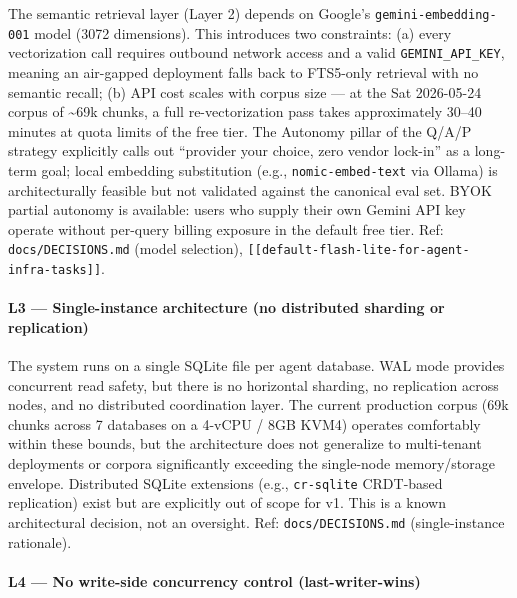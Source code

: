 \documentclass[
]{article}
\begin{document}
The semantic retrieval layer (Layer 2) depends on Google's
\texttt{gemini-embedding-001} model (3072 dimensions). This introduces
two constraints: (a) every vectorization call requires outbound network
access and a valid \texttt{GEMINI\_API\_KEY}, meaning an air-gapped
deployment falls back to FTS5-only retrieval with no semantic recall;
(b) API cost scales with corpus size --- at the Sat 2026-05-24 corpus of
\textasciitilde69k chunks, a full re-vectorization pass takes
approximately 30--40 minutes at quota limits of the free tier. The
Autonomy pillar of the Q/A/P strategy explicitly calls out ``provider
your choice, zero vendor lock-in'' as a long-term goal; local embedding
substitution (e.g., \texttt{nomic-embed-text} via Ollama) is
architecturally feasible but not validated against the canonical eval
set. BYOK partial autonomy is available: users who supply their own
Gemini API key operate without per-query billing exposure in the default
free tier. Ref: \texttt{docs/DECISIONS.md} (model selection),
\texttt{{[}{[}default-flash-lite-for-agent-infra-tasks{]}{]}}.

\paragraph{L3 --- Single-instance architecture (no distributed sharding
or
replication)}\label{l3-single-instance-architecture-no-distributed-sharding-or-replication}

The system runs on a single SQLite file per agent database. WAL mode
provides concurrent read safety, but there is no horizontal sharding, no
replication across nodes, and no distributed coordination layer. The
current production corpus (69k chunks across 7 databases on a 4-vCPU /
8GB KVM4) operates comfortably within these bounds, but the architecture
does not generalize to multi-tenant deployments or corpora significantly
exceeding the single-node memory/storage envelope. Distributed SQLite
extensions (e.g., \texttt{cr-sqlite} CRDT-based replication) exist but
are explicitly out of scope for v1. This is a known architectural
decision, not an oversight. Ref: \texttt{docs/DECISIONS.md}
(single-instance rationale).

\paragraph{L4 --- No write-side concurrency control
(last-writer-wins)}\label{l4-no-write-side-concurrency-control-last-writer-wins}
\end{document}
